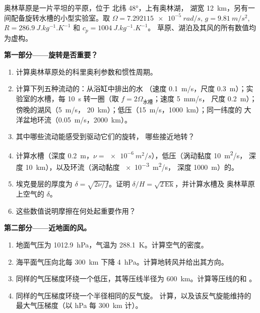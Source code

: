 \begin{problem}
\label{pb:b3:gfd-foundations:1}
奥林草原是一片平坦的平原，位于 北纬 \ang{48}，上有奥林湖，
湖宽 \qty{12}{km}，另有一间配备旋转水槽的小型实验室。取
$\Omega = \qty{7.292115e-5}{rad/s}$, $g = \qty{9.81}{m/s^2}$, $R =
\qty{286.9}{J.kg^{-1}.K^{-1}}$ 和 $c_p = \qty{1004}{J.kg^{-1}.K^{-1}}$。
草原、湖泊及其风的所有数值均为虚构。

\medskip\noindent\textbf{第一部分——旋转是否重要？}
\begin{enumerate}
\item 计算奥林草原处的科里奥利参数和惯性周期。
\item 计算下列五种流动的：从浴缸中排出的水
  （速度 \qty{0.1}{m/s}，尺度 \qty{0.3}{m}）；实验室的水槽，每
  \qty{10}{s} 转一圈（取 $f = 2\Omega_{\text{水槽}}$；速度 \qty{5}{mm/s}，
  尺度 \qty{0.2}{m}）；傍晚的湖风（\qty{5}{m/s}，
  \qty{20}{km}）；低压（\qty{15}{m/s}，\qty{1000}{km}）；同一纬度的
  大洋盆地环流（\qty{0.05}{m/s}，\qty{2000}{km}）。
\item 其中哪些流动能感受到驱动它们的旋转，
  哪些接近地转？
\item 计算水槽（深度 \qty{0.2}{m}，$\nu =
  \qty{e-6}{m^2/s}$），低压（涡动黏度 \qty{10}{m^2/s}，
  深度 \qty{10}{km}），以及环流（涡动黏度 \qty{e-3}{m^2/s}，
  深度 \qty{1000}{m}）的。
\item 埃克曼层的厚度为 $\delta = \sqrt{2\nu/f}$。证明
  $\delta/H = \sqrt{2\,\mathrm{Ek}}$，并计算水槽及
  奥林草原上空气的 $\delta$。
\item 这些数值说明摩擦在何处起重要作用？
\end{enumerate}

\medskip\noindent\textbf{第二部分——近地面的风。}
\begin{enumerate}[resume]
\item 地面气压为 \qty{1012.9}{hPa}，气温为
  \qty{288.1}{K}。计算空气的密度。
\item 海平面气压向北每
  \qty{300}{km} 下降 \qty{4}{hPa}。计算地转风并给出其方向。
\item 同样的气压梯度环绕一个低压，其等压线半径为
  \qty{600}{km}。计算等压线的和
  。
\item 同样的气压梯度环绕一个半径相同的反气旋。
  计算，以及该反气旋能维持的最大气压梯度（以
  \unit{hPa} 每 \qty{300}{km} 计）。
\end{enumerate}


\end{problem}
